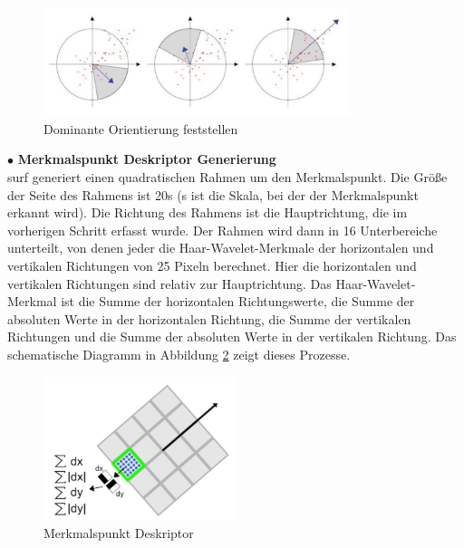\begin{figure}[htb]
 \centering 
 \includegraphics[keepaspectratio,width=0.8\textwidth]{images/3_Ersteverfahren/Dominante_Orientierung_Feststellen.pdf}
 \caption{Dominante Orientierung feststellen}
 \label{fig:Dominante Orientierung Feststellen}
\end{figure} 


$\bullet$ \textbf{Merkmalspunkt Deskriptor Generierung}\\
\gls{surf} generiert einen quadratischen Rahmen um den Merkmalspunkt. Die Größe der Seite des Rahmens ist 20\si{s} (s ist die Skala, bei der der Merkmalspunkt erkannt wird). Die Richtung des Rahmens ist die Hauptrichtung, die im vorherigen Schritt erfasst wurde. Der Rahmen wird dann in 16 Unterbereiche unterteilt, von denen jeder die Haar-Wavelet-Merkmale der horizontalen und vertikalen Richtungen von 25 Pixeln berechnet. Hier die horizontalen und vertikalen Richtungen sind relativ zur Hauptrichtung. Das Haar-Wavelet-Merkmal ist die Summe der horizontalen Richtungswerte, die Summe der absoluten Werte in der horizontalen Richtung, die Summe der vertikalen Richtungen und die Summe der absoluten Werte in der vertikalen Richtung. Das schematische Diagramm in Abbildung \ref{fig:Merkmalspunkt Deskriptor} zeigt dieses Prozesse.

\begin{figure}[htb]
 \centering 
 \includegraphics[keepaspectratio,width=0.5\textwidth]{images/3_Ersteverfahren/Merkmalspunkt_Deskriptor.pdf}
 \caption{Merkmalspunkt Deskriptor}
 \label{fig:Merkmalspunkt Deskriptor}
\end{figure} 

